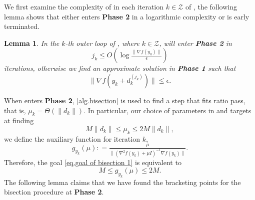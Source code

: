 \documentclass{article}
\theoremstyle{plain}
\newtheorem{lemma}[theorem]{Lemma}
\theoremstyle{definition}
\theoremstyle{remark}
\begin{document}

We first examine the complexity of  in each iteration $k\in \mathcal{Z}$ of , the following lemma shows that either  enters \textbf{Phase 2} in a logarithmic complexity or  is early terminated.

\begin{lemma}
    \label{lem.inner loop terminate}
    In the $k$-th outer loop of , where $k\in\mathcal{Z}$,  will enter \textbf{Phase 2} in
    \begin{equation*}
        j_k \leq O\left (\log \tfrac{\|\nabla f(y_k)\|}{\epsilon}\right)
    \end{equation*}
    iterations, otherwise we find an approximate solution in \textbf{Phase 1} such that
    \begin{equation*}
        \| \nabla f(y_k+d_k^{(j_k)})\| \leq \epsilon.
    \end{equation*}
\end{lemma}

When  enters \textbf{Phase 2}, \cref{alg.bisection} is used to find a step that fits ratio pass, that is, $\mu_k = \Theta(\|d_k\|)$. In particular, our choice of parameters in  and  targets at finding
\begin{equation}\label{eq.goal of bisection 1}
    M\|d_k\| \leq \mu_k\leq 2M\|d_k\|,
\end{equation}
we define the auxiliary function for iteration $k$,
\begin{equation}\label{eq.auxiliary bisection function}
    g_{y_k}(\mu): = \tfrac{\mu}{\|\left(\nabla^2 f(y_k)+\mu I\right)^{-1}\nabla f(y_k)\|}.
\end{equation}
Therefore, the goal \eqref{eq.goal of bisection 1} is equivalent to
\begin{equation}
    \label{eq.goal of bisection 2}
    M\leq g_{y_k}(\mu)\leq 2M.
\end{equation}
The following lemma claims that we have found the bracketing points for the bisection procedure at \textbf{Phase 2}.
\end{document}

